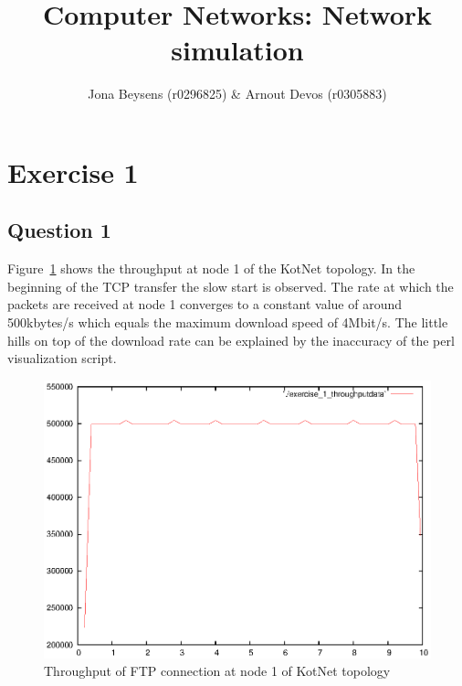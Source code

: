 \documentclass[a4paper]{report}
\title{Computer Networks: Network simulation}
\author{Jona Beysens (r0296825) \& Arnout Devos (r0305883)}
\begin{document}
\maketitle
\chapter*{Exercise 1}

\section*{Question 1}
Figure~\ref{ex1:question1} shows the throughput at node 1 of the KotNet topology. 
In the beginning of the TCP transfer the slow start is observed. The rate at which the packets are received at node 1 converges to a constant value of around 500kbytes/s which equals the maximum download speed of 4Mbit/s. The little hills on top of the download rate can be explained by the inaccuracy of the perl visualization script.
\begin{figure}[h]
\centerline{\includegraphics{pictures/E1Q1.eps}}
\caption{Throughput of FTP connection at node 1 of KotNet topology}
\label{ex1:question1}
\end{figure}
\end{document}
